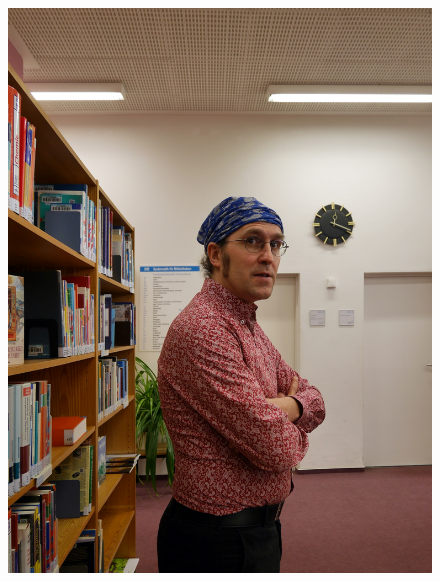 \documentclass[a4paper,
fontsize=11pt,
oneside,
numbers=noperiodatend,
parskip=half-,
bibliography=totoc,
final
]{scrartcl}
\begin{document}
\begin{figure}
\centering
\includegraphics{img/danilo-bibliothek-2.jpg}
\caption{}
\end{figure}
\end{document}
